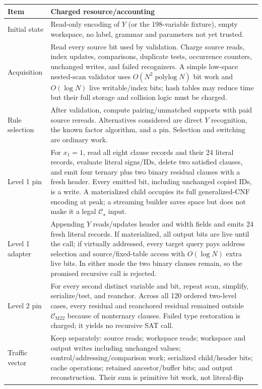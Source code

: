 \documentclass[11pt]{article}
\newcommand{\Cstar}{\mathcal C_\star}
\newcommand{\CM}{\mathcal C_{\mathrm{M22}}}
\begin{document}
\begin{longtable}{@{}p{.15\linewidth}p{.78\linewidth}@{}}\toprule
Item&Charged resource/accounting\\\midrule\endhead
Initial state&Read-only encoding of $Y$ (or the 198-variable fixture), empty
workspace, no label, grammar and parameters not yet trusted.\\
Acquisition&Read every source bit used by validation.  Charge source reads,
index updates, comparisons, duplicate tests, occurrence counters, unchanged
writes, and failed recognizers.  A simple low-space nested-scan validator uses
$O(N^2\operatorname{polylog}N)$ bit work and $O(\log N)$ live writable/index
bits; hash tables may reduce time but their full storage and collision logic
must be charged.\\
Rule selection&After validation, compute pairing/unmatched supports with paid
source rereads.  Alternatives considered are direct $Y$ recognition, the
known factor algorithm, and a pin.  Selection and switching are ordinary work.\\
Level 1 pin&For $x_1=1$, read all eight clause records and their 24 literal
records, evaluate literal signs/IDs, delete two satisfied clauses, and emit four
ternary plus two binary residual clauses with a fresh header.  Every emitted
bit, including unchanged copied IDs, is a write.  A materialized child occupies
its full generalized-CNF encoding at peak; a streaming builder saves space but
does not make it a legal $\Cstar$ input.\\
Level 1 adapter&Appending $Y$ reads/updates header and width fields and emits 24
fresh literal records.  If materialized, all output bits are live until the
call; if virtually addressed, every target query pays address selection and
source/fixed-table access with $O(\log N)$ extra live bits.  In either mode the
two binary clauses remain, so the promised recursive call is rejected.\\
Level 2 pin&For every second distinct variable and bit, repeat scan, simplify,
serialize/test, and reanchor.  Across all 120 ordered two-level cases, every
residual and reanchored residual remained outside $\CM$ because of nonternary
clauses.  Failed type restoration is charged; it yields no recursive SAT call.\\
Traffic vector&Keep separately: source reads; workspace reads; workspace and
output writes including unchanged values; control/addressing/comparison work;
serialized child/header bits; cache operations; retained ancestor/buffer bits;
and output reconstruction.  Their sum is primitive bit work, not literal-flip

\end{longtable}
\end{document}

